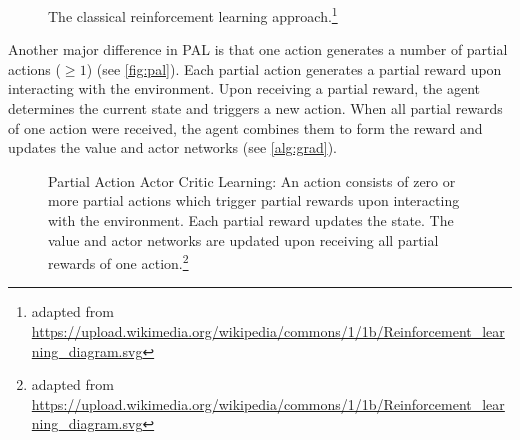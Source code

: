 \documentclass[sigconf]{acmart}
\begin{document}
\begin{figure}
\begin{minipage}{\columnwidth}

\caption{The classical reinforcement learning approach.\protect\footnote{adapted from \url{https://upload.wikimedia.org/wikipedia/commons/1/1b/Reinforcement_learning_diagram.svg}}}
\label{fig:reinforcement}
\end{minipage}
\end{figure}

Another major difference in PAL is that one action generates a number of partial actions ($\geq 1$) (see \autoref{fig:pal}). Each partial action generates a partial reward upon interacting with the environment. Upon receiving a partial reward, the agent determines the current state and triggers a new action. When all partial rewards of one action were received, the agent combines them to form the reward and updates the value and actor networks (see \autoref{alg:grad}). 

\begin{figure}
\begin{minipage}{\columnwidth}

\caption{Partial Action Actor Critic Learning: An action consists of zero or more partial actions which trigger partial rewards upon interacting with the environment. Each partial reward updates the state. The value and actor networks are updated upon receiving all partial rewards of one action.\protect\footnote{adapted from \url{https://upload.wikimedia.org/wikipedia/commons/1/1b/Reinforcement_learning_diagram.svg}}}
\label{fig:pal}
\end{minipage}
\end{figure}
\end{document}
